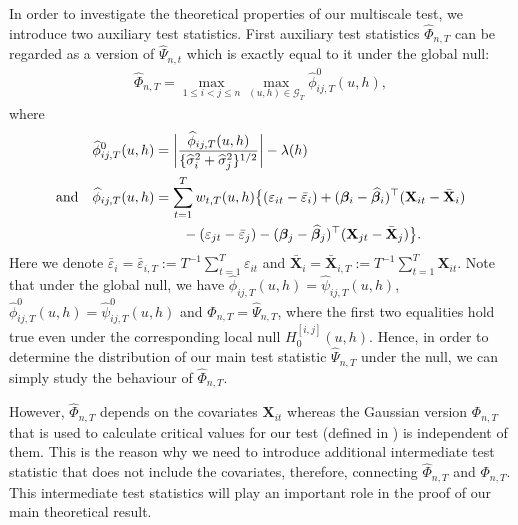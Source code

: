 \documentclass[a4paper,12pt]{article}
\makeatletter
\renewcommand{\eqref}[1]{\tagform@{\ref{#1}}}
\makeatother
\begin{document}
In order to investigate the theoretical properties of our multiscale test, we introduce two auxiliary test statistics. First auxiliary test statistics $\widehat{\Phi}_{n, T}$ can be regarded as a version of $\widehat{\Psi}_{n, t}$ which is exactly equal to it under the global null:
\begin{align}\label{eq:Phi_hat}
\widehat{\Phi}_{n,T} = \max_{1 \le i < j \le n}  \max_{(u,h) \in \mathcal{G}_T} \widehat{\phi}^0_{ij,T}(u,h),
\end{align}
where
\begin{align}\label{eq:phi_hat_ij_zero}
\widehat{\phi}^0_{ij,T}(u,h) &=\bigg| \frac{\widehat{\phi}_{ij,T}(u,h)} {\{ \widehat{\sigma}_i^2 + \widehat{\sigma}_j^2 \}^{1/2}} \bigg| - \lambda(h)\\
\text{and} \quad \widehat{\phi}_{ij,T}(u,h) &= \sum_{t=1}^T w_{t,T}(u,h) \big\{ (\varepsilon_{it} - \bar{\varepsilon}_i) + (\bm{\beta}_i - \widehat{\bm{\beta}}_i)^\top (\mathbf{X}_{it} - \bar{\mathbf{X}}_{i}) \nonumber\\
& \quad \quad - (\varepsilon_{jt} - \bar{\varepsilon}_j) -  (\bm{\beta}_j - \widehat{\bm{\beta}}_j)^\top (\mathbf{X}_{jt} - \bar{\mathbf{X}}_{j}) \big\}.\nonumber
\end{align}
Here we denote $\bar{\varepsilon}_i = \bar{\varepsilon}_{i,T} := T^{-1} \sum_{t=1}^T \varepsilon_{it}$ and
$ \bar{\mathbf{X}}_{i} =  \bar{\mathbf{X}}_{i, T} := T^{-1}\sum_{t=1}^T  \mathbf{X}_{it}$. Note that under the global null, we have $\widehat{\phi}_{ij,T}(u,h) = \widehat{\psi}_{ij,T}(u,h)$, $\widehat{\phi}^0_{ij,T}(u,h) = \widehat{\psi}^0_{ij,T}(u,h)$ and $\widehat{\Phi}_{n,T} = \widehat{\Psi}_{n,T}$, where the first two equalities hold true even under the corresponding local null $H_0^{[i, j]}(u, h)$. Hence, in order to determine the distribution of our main test statistic $\widehat{\Psi}_{n,T}$ under the null, we can simply study the behaviour of $\widehat{\Phi}_{n,T}$. 

However, $\widehat{\Phi}_{n,T}$ depends on the covariates $\mathbf{X}_{it}$ whereas the Gaussian version $\Phi_{n,T}$ that is used to calculate critical values for our test (defined in \eqref{eq:Phi}) is independent of them. This is the reason why we need to introduce additional intermediate test statistic that does not include the covariates, therefore, connecting $\widehat{\Phi}_{n,T}$ and $\Phi_{n,T}$. This intermediate test statistics will play an important role in the proof of our main theoretical result.
\end{document}
